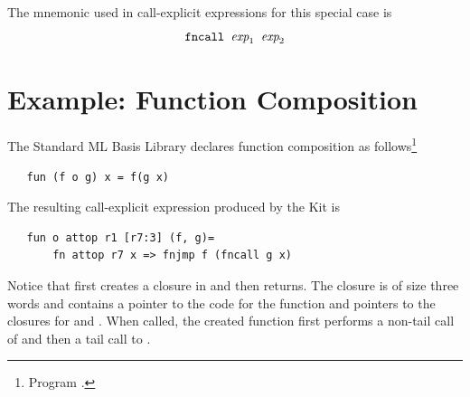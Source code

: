 \documentclass[12pt]{book}
\begin{document}
The mnemonic used in call-explicit expressions for this special case is
$$\hbox{\tt fncall $\hbox{\it exp}_1$ $\hbox{\it exp}_2$}$$

\section{Example: Function Composition}
The Standard ML Basis Library declares function composition as
follows\footnote{Program .}
\begin{verbatim}
   fun (f o g) x = f(g x)
\end{verbatim}
The resulting call-explicit expression produced by the Kit is
\begin{verbatim}
   fun o attop r1 [r7:3] (f, g)= 
       fn attop r7 x => fnjmp f (fncall g x)
\end{verbatim}
Notice that 
%
 first creates a closure in  and then returns.
The closure is of size three words and contains a pointer to the code
for the function and pointers to the closures for  and
. When called, the created function first performs a non-tail
call of  and then a tail call to .
\end{document}
